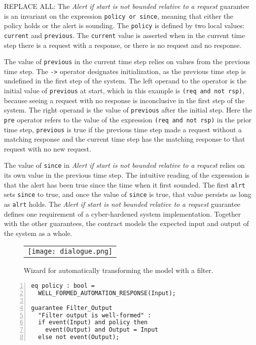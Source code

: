 REPLACE ALL: 
The \emph{Alert if start is not bounded relative to a request} guarantee is an invariant on the expression \texttt{policy or since}, meaning that either the policy holds or the alert is sounding.
The \texttt{policy} is defined by two local values: \texttt{current} and \texttt{previous}.
The \texttt{current} value is asserted when in the current time step there is a request with a response, or there is no request and no response.

The value of \texttt{previous} in the current time step relies on values from the previous time step.
The \texttt{->} operator designates initialization, as the previous time step is undefined in the first step of the system.
The left operand to the operator is the initial value of \texttt{previous} at start, which in this example is \texttt{(req and not rsp)}, because seeing a request with no response is inconclusive in the first step of the system.
The right operand is the value of \texttt{previous} after the initial step.
Here the \texttt{pre} operator refers to the value of the expression \texttt{(req and not rsp)} in the prior time step, \texttt{previous} is true if the previous time step made a request without a matching response and the current time step has the matching response to that request with no new request.

The value of \texttt{since} in \emph{Alert if start is not bounded relative to a request} relies on its own value in the previous time step.
The intuitive reading of the expression is that the alert has been true since the time when it first sounded.
The first \texttt{alrt} sets \texttt{since} to true, and once the value of \texttt{since} is true, that value persists as long as \texttt{alrt} holds.
The \emph{Alert if start is not bounded relative to a request} guarantee defines one requirement of a cyber-hardened system implementation.
Together with the other guarantees, the contract models the expected input and output of the system as a whole.

\begin{figure}
  \begin{center}
    \begin{tabular}{c}
      \texttt{[image: dialogue.png]}
    \end{tabular}
  \end{center}
  \caption{Wizard for automatically transforming the model with a filter.}
  \label{fig:dialogue}
\end{figure}

\newsavebox{\flt}
\begin{lrbox}{\flt}
\begin{lstlisting}[style=agree,numbers=left]
eq policy : bool = 
  WELL_FORMED_AUTOMATION_RESPONSE(Input);

guarantee Filter_Output
  "Filter output is well-formed" :
  if event(Input) and policy then 
    event(Output) and Output = Input
  else not event(Output);
\end{lstlisting}
\end{lrbox}

